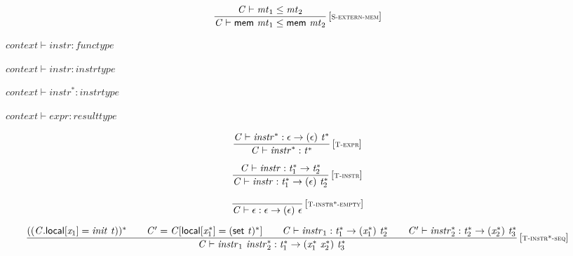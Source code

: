 $$
\begin{array}{@{}c@{}}\displaystyle
\frac{
{\mathit{C}} \vdash {\mathit{mt}}_{{1}} \leq {\mathit{mt}}_{{2}}
}{
{\mathit{C}} \vdash \mathsf{mem}~{\mathit{mt}}_{{1}} \leq \mathsf{mem}~{\mathit{mt}}_{{2}}
} \, {[\textsc{\scriptsize S{-}extern{-}mem}]}
\qquad
\end{array}
$$

\vspace{1ex}

$\boxed{{\mathit{context}} \vdash {\mathit{instr}} : {\mathit{functype}}}$

$\boxed{{\mathit{context}} \vdash {\mathit{instr}} : {\mathit{instrtype}}}$

$\boxed{{\mathit{context}} \vdash {{\mathit{instr}}^\ast} : {\mathit{instrtype}}}$

$\boxed{{\mathit{context}} \vdash {\mathit{expr}} : {\mathit{resulttype}}}$

\vspace{1ex}

$$
\begin{array}{@{}c@{}}\displaystyle
\frac{
{\mathit{C}} \vdash {{\mathit{instr}}^\ast} : \epsilon \rightarrow (\epsilon)~{{\mathit{t}}^\ast}
}{
{\mathit{C}} \vdash {{\mathit{instr}}^\ast} : {{\mathit{t}}^\ast}
} \, {[\textsc{\scriptsize T{-}expr}]}
\qquad
\end{array}
$$

\vspace{1ex}

$$
\begin{array}{@{}c@{}}\displaystyle
\frac{
{\mathit{C}} \vdash {\mathit{instr}} : {{\mathit{t}}_{{1}}^\ast} \rightarrow {{\mathit{t}}_{{2}}^\ast}
}{
{\mathit{C}} \vdash {\mathit{instr}} : {{\mathit{t}}_{{1}}^\ast} \rightarrow (\epsilon)~{{\mathit{t}}_{{2}}^\ast}
} \, {[\textsc{\scriptsize T{-}instr}]}
\qquad
\end{array}
$$

$$
\begin{array}{@{}c@{}}\displaystyle
\frac{
}{
{\mathit{C}} \vdash \epsilon : \epsilon \rightarrow (\epsilon)~\epsilon
} \, {[\textsc{\scriptsize T{-}instr*{-}empty}]}
\qquad
\end{array}
$$

$$
\begin{array}{@{}c@{}}\displaystyle
\frac{
(({\mathit{C}}.\mathsf{local}{}[{\mathit{x}}_{{1}}] = {\mathit{init}}~{\mathit{t}}))^\ast
 \qquad
{\mathit{C}'} = {\mathit{C}}{}[\mathsf{local}{}[{{\mathit{x}}_{{1}}^\ast}] = {(\mathsf{set}~{\mathit{t}})^\ast}]
 \qquad
{\mathit{C}} \vdash {\mathit{instr}}_{{1}} : {{\mathit{t}}_{{1}}^\ast} \rightarrow ({{\mathit{x}}_{{1}}^\ast})~{{\mathit{t}}_{{2}}^\ast}
 \qquad
{\mathit{C}'} \vdash {{\mathit{instr}}_{{2}}^\ast} : {{\mathit{t}}_{{2}}^\ast} \rightarrow ({{\mathit{x}}_{{2}}^\ast})~{{\mathit{t}}_{{3}}^\ast}
}{
{\mathit{C}} \vdash {\mathit{instr}}_{{1}}~{{\mathit{instr}}_{{2}}^\ast} : {{\mathit{t}}_{{1}}^\ast} \rightarrow ({{\mathit{x}}_{{1}}^\ast}~{{\mathit{x}}_{{2}}^\ast})~{{\mathit{t}}_{{3}}^\ast}
} \, {[\textsc{\scriptsize T{-}instr*{-}seq}]}
\qquad
\end{array}
$$

